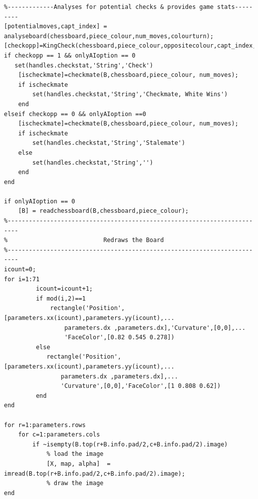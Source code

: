 \documentclass[11pt,a4paper]{article}
\begin{document}
\begin{lstlisting}
%-------------Analyses for potential checks & provides game stats---------
[potentialmoves,capt_index] = analyseboard(chessboard,piece_colour,num_moves,colourturn);
[checkopp]=KingCheck(chessboard,piece_colour,oppositecolour,capt_index,potentialmoves);
if checkopp == 1 && onlyAIoption == 0
   set(handles.checkstat,'String','Check')
    [ischeckmate]=checkmate(B,chessboard,piece_colour, num_moves);
    if ischeckmate
        set(handles.checkstat,'String','Checkmate, White Wins')
    end
elseif checkopp == 0 && onlyAIoption ==0
    [ischeckmate]=checkmate(B,chessboard,piece_colour, num_moves);
    if ischeckmate
        set(handles.checkstat,'String','Stalemate')
    else
        set(handles.checkstat,'String','')
    end
end

if onlyAIoption == 0
    [B] = readchessboard(B,chessboard,piece_colour);
%-------------------------------------------------------------------------
%                           Redraws the Board
%-------------------------------------------------------------------------
icount=0;
for i=1:71
         icount=icount+1;
         if mod(i,2)==1
             rectangle('Position',[parameters.xx(icount),parameters.yy(icount),...
                 parameters.dx ,parameters.dx],'Curvature',[0,0],...
                 'FaceColor',[0.82 0.545 0.278])
         else
            rectangle('Position',[parameters.xx(icount),parameters.yy(icount),...
                parameters.dx ,parameters.dx],...
                'Curvature',[0,0],'FaceColor',[1 0.808 0.62])             
         end
end

for r=1:parameters.rows
    for c=1:parameters.cols
        if ~isempty(B.top(r+B.info.pad/2,c+B.info.pad/2).image)
            % load the image
            [X, map, alpha]  = imread(B.top(r+B.info.pad/2,c+B.info.pad/2).image);
            % draw the image
end
\end{lstlisting}
\end{document}
